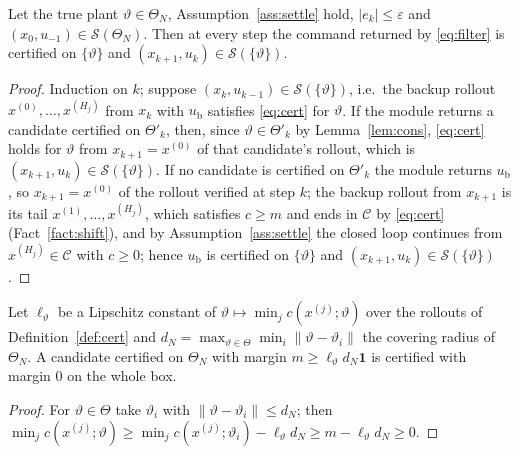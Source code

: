 \documentclass[final,5p,times,twocolumn]{elsarticle}
\begin{document}
\begin{lemma}\label{lem:rf}
Let the true plant $\vartheta\in\Theta_N$, Assumption~\ref{ass:settle} hold, $|e_k|\le\varepsilon$ and $(x_0,u_{-1})\in\mathcal S(\Theta_N)$. Then at every step the command returned by \eqref{eq:filter} is certified on $\{\vartheta\}$ and $(x_{k+1},u_k)\in\mathcal S(\{\vartheta\})$.
\end{lemma}
\begin{proof}
Induction on $k$; suppose $(x_k,u_{k-1})\in\mathcal S(\{\vartheta\})$, i.e.\ the backup rollout $x^{(0)},\dots,x^{(H_j)}$ from $x_k$ with $u_{\mathrm b}$ satisfies \eqref{eq:cert} for $\vartheta$. If the module returns a candidate certified on $\Theta'_k$, then, since $\vartheta\in\Theta'_k$ by Lemma~\ref{lem:cons}, \eqref{eq:cert} holds for $\vartheta$ from $x_{k+1}=x^{(0)}$ of that candidate's rollout, which is $(x_{k+1},u_k)\in\mathcal S(\{\vartheta\})$. If no candidate is certified on $\Theta'_k$ the module returns $u_{\mathrm b}$, so $x_{k+1}=x^{(0)}$ of the rollout verified at step $k$; the backup rollout from $x_{k+1}$ is its tail $x^{(1)},\dots,x^{(H_j)}$, which satisfies $c\ge m$ and ends in $\mathcal C$ by \eqref{eq:cert} (Fact~\ref{fact:shift}), and by Assumption~\ref{ass:settle} the closed loop continues from $x^{(H_j)}\in\mathcal C$ with $c\ge0$; hence $u_{\mathrm b}$ is certified on $\{\vartheta\}$ and $(x_{k+1},u_k)\in\mathcal S(\{\vartheta\})$.
\end{proof}

\begin{lemma}\label{lem:cover}
Let $\ell_\vartheta$ be a Lipschitz constant of $\vartheta\mapsto\min_jc(x^{(j)};\vartheta)$ over the rollouts of Definition~\ref{def:cert} and $d_N=\max_{\vartheta\in\Theta}\min_i\|\vartheta-\vartheta_i\|$ the covering radius of $\Theta_N$. A candidate certified on $\Theta_N$ with margin $m\ge\ell_\vartheta d_N\mathbf 1$ is certified with margin $0$ on the whole box.
\end{lemma}
\begin{proof}
For $\vartheta\in\Theta$ take $\vartheta_i$ with $\|\vartheta-\vartheta_i\|\le d_N$; then $\min_jc(x^{(j)};\vartheta)\ge\min_jc(x^{(j)};\vartheta_i)-\ell_\vartheta d_N\ge m-\ell_\vartheta d_N\ge0$.
\end{proof}
\end{document}
